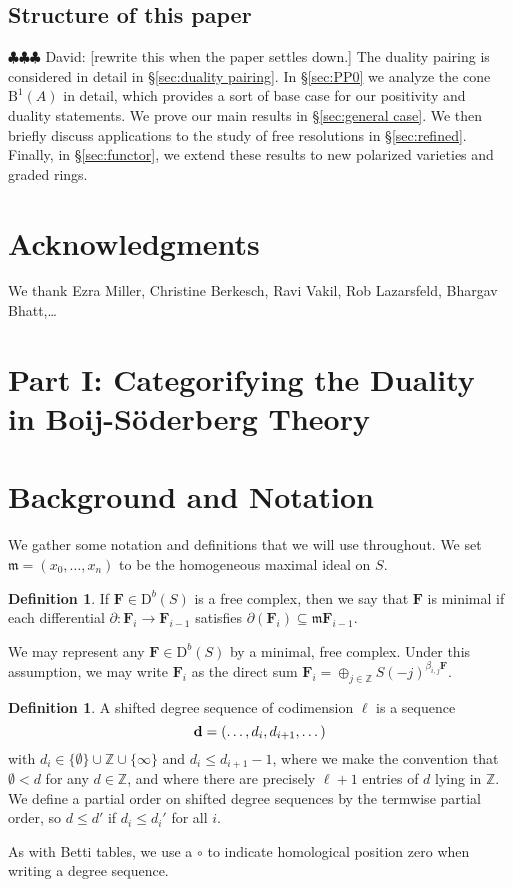 \documentclass[12pt]{amsart}
\theoremstyle{definition}
\newtheorem{defn}[lemma]{Definition}
\theoremstyle{remark}
\newcommand{\ZZ}{\mathbb{Z}}
\newcommand{\FF}{\mathbf{F}}
\newcommand{\defi}[1]{\textsf{#1}} %
\newcommand{\zp}{\circ}
\newcommand{\DD}{\mathrm{D}}
\newcommand{\BBQ}{\mathrm{B}}
\newcommand{\david}[1]{{\color{red} \sf $\clubsuit\clubsuit\clubsuit$ David: [#1]}}
\begin{document}
\subsection*{Structure of this paper}
\david{rewrite this when the paper settles down.} 
 The duality pairing is considered in detail in \S\ref{sec:duality pairing}. In \S\ref{sec:PP0} we analyze the cone $\BBQ^1(A)$ in detail, which provides a sort of base case for our positivity and duality statements.  We prove our main results in \S\ref{sec:general case}.  We then briefly discuss applications to the study of free resolutions in \S\ref{sec:refined}.  Finally, in \S\ref{sec:functor}, we extend these results to new polarized varieties and graded rings.

\section*{Acknowledgments}
We thank Ezra Miller, Christine Berkesch, Ravi Vakil, Rob Lazarsfeld, Bhargav Bhatt,\dots



\section*{Part I: Categorifying the Duality in Boij-S\"oderberg Theory}
\section{Background and Notation}\label{sec:notation}
We gather some notation and definitions that we will use throughout.  We set $\mathfrak m=(x_0, \dots, x_n)$ to be the homogeneous maximal ideal on $S$.
\begin{defn}
If $\FF\in \DD^b(S)$ is a free complex, then we say that $\FF$ is \defi{minimal} if each differential $\partial: \FF_i\to \FF_{i-1}$ satisfies $\partial(\FF_i)\subseteq \mathfrak m\FF_{i-1}$.
\end{defn}
We may represent any $\FF\in \DD^b(S)$ by a minimal, free complex.  Under this assumption, we may write $\FF_i$ as the direct sum $\FF_i=\oplus_{j\in \ZZ} S(-j)^{\beta_{i,j}\FF}$.


\begin{defn}
A \defi{shifted degree sequence of codimension $\ell$} is a sequence
\[{\bf d}=(\dots, d_i, d_{i+1}, \dots)
\]
with  $d_{i} \in \{\emptyset\}\cup \ZZ\cup \{\infty\}$ and $d_i \leq d_{i+1}-1$, where we make the convention that $\emptyset<d$ for any $d\in \ZZ$, and 
where there are precisely $\ell+1$ entries of $d$ lying in $\ZZ$. 
We define a partial order on shifted degree sequences by the termwise partial order, so $d\leq d'$ if $d_i\leq d_i'$ for all $i$.

As with Betti tables, we use a $\zp$ to indicate homological position zero when writing a degree sequence. 
\end{defn}
\end{document}
